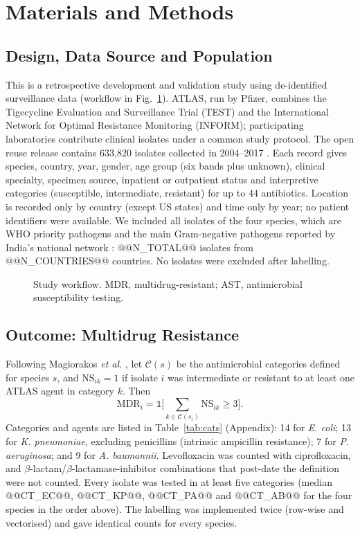 \documentclass[conference]{IEEEtran}
\newcommand{\sci}[1]{\textit{#1}}
\begin{document}
\section{Materials and Methods}\label{sec:methods}
\subsection{Design, Data Source and Population}\label{sec:data}
This is a retrospective development and validation study using de-identified surveillance data (workflow in Fig.~\ref{fig:workflow}). ATLAS, run by Pfizer, combines the Tigecycline Evaluation and Surveillance Trial (TEST) and the International Network for Optimal Resistance Monitoring (INFORM); participating laboratories contribute clinical isolates under a common study protocol. The open reuse release contains 633{,}820 isolates collected in 2004--2017 \cite{catalan2022,vivli}. Each record gives species, country, year, gender, age group (six bands plus unknown), clinical specialty, specimen source, inpatient or outpatient status and interpretive categories (susceptible, intermediate, resistant) for up to 44 antibiotics. Location is recorded only by country (except US states) and time only by year; no patient identifiers were available. We included all isolates of the four species, which are WHO priority pathogens \cite{who_bppl2024} and the main Gram-negative pathogens reported by India's national network \cite{icmr2024}: @@N_TOTAL@@ isolates from @@N_COUNTRIES@@ countries. No isolates were excluded after labelling.

\begin{figure}[!t]
\centering

\caption{Study workflow. MDR, multidrug-resistant; AST, antimicrobial susceptibility testing.}
\label{fig:workflow}
\end{figure}

\subsection{Outcome: Multidrug Resistance}\label{sec:outcome}
Following Magiorakos \textit{et al.} \cite{magiorakos2012}, let $\mathcal{C}(s)$ be the antimicrobial categories defined for species $s$, and $\mathrm{NS}_{ik}=1$ if isolate $i$ was intermediate or resistant to at least one ATLAS agent in category $k$. Then
\begin{equation}
\mathrm{MDR}_i=\mathbb{1}\Big[\sum_{k\in\mathcal{C}(s_i)}\mathrm{NS}_{ik}\ge 3\Big].
\label{eq:mdr}
\end{equation}
Categories and agents are listed in Table~\ref{tab:cats} (Appendix): 14 for \sci{E. coli}; 13 for \sci{K. pneumoniae}, excluding penicillins (intrinsic ampicillin resistance); 7 for \sci{P. aeruginosa}; and 9 for \sci{A. baumannii}. Levofloxacin was counted with ciprofloxacin, and $\beta$-lactam/$\beta$-lactamase-inhibitor combinations that post-date the definition were not counted. Every isolate was tested in at least five categories (median @@CT_EC@@, @@CT_KP@@, @@CT_PA@@ and @@CT_AB@@ for the four species in the order above). The labelling was implemented twice (row-wise and vectorised) and gave identical counts for every species.
\end{document}

